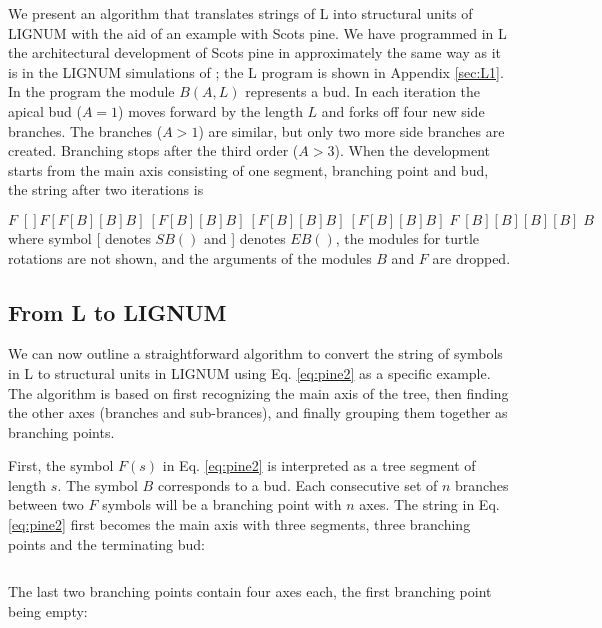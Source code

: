 We present an  algorithm that translates strings of  L into structural
units of LIGNUM  with the aid of an example with  Scots pine.  We have
programmed  in  L  the  architectural  development of  Scots  pine  in
approximately  the same  way as  it is  in the  LIGNUM  simulations of
\citet{perttunen:96, perttunen:98}; the L program is shown in Appendix
\ref{sec:L1}.  In the program the module $B(A,L)$ represents a bud. In
each iteration  the apical bud ($A  = 1$) moves forward  by the length
$L$ and forks off four new  side branches.  The branches ($A > 1$) are
similar, but only two more side branches are created.  Branching stops
after the third order ($A > 3$).  When the development starts from the
main  axis consisting  of one  segment, branching  point and  bud, the
string after two iterations is

\begin{equation}\label{eq:pine2}
F\;[] F [F[B][B]B]\:[F[B][B]B]\:[F[B][B]B]\:[F[B][B]B]\; F \;[B][B][B][B]\; B
\end{equation}
where symbol  [ denotes $SB()$ and  ] denotes $EB()$,  the modules for
turtle rotations are  not shown, and the arguments  of the modules $B$
and $F$ are dropped.

\subsection{From L to LIGNUM}\label{sec:LToLignum}

We can now  outline a straightforward algorithm to  convert the string
of symbols in L to structural units in LIGNUM using Eq. \ref{eq:pine2}
as a  specific example.  The  algorithm is based on  first recognizing
the main axis  of the tree, then finding the  other axes (branches and
sub-brances), and finally grouping them together as branching points.

First, the  symbol $F(s)$ in  Eq.  \ref{eq:pine2} is interpreted  as a
tree  segment of length  $s$.  The  symbol $B$  corresponds to  a bud.
Each consecutive set of $n$ branches between two $F$ symbols will be a
branching  point with  $n$ axes.   The string  in  Eq.  \ref{eq:pine2}
first  becomes the  main  axis with  three  segments, three  branching
points and the terminating bud:

\begin{equation}
[TS, BP, TS, BP, TS, BP, B]
\end{equation}

The  last two  branching  points  contain four  axes  each, the  first
branching point being empty:

